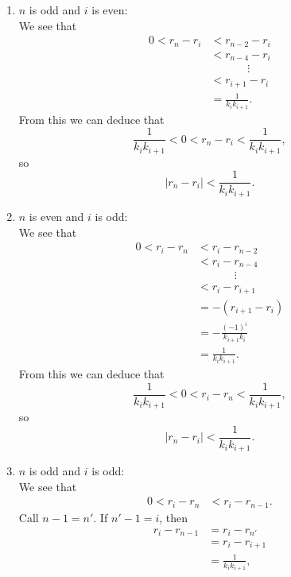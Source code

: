 \documentclass[12 pt]{amsart}
\begin{document}
  \begin{enumerate}[(1)]
    \item $n$ is odd and $i$ is even: \\
      We see that 
      \begin{align*}
        0 < r_n - r_i &< r_{n-2} - r_i \\
                      &< r_{n-4} - r_i \\
                      &\phantom{<\qquad}\vdots \\
                      &< r_{i+1} - r_i \\
                      &= \frac{1}{k_i k_{i+1}}.
      \end{align*}
      From this we can deduce that
      \[
        \frac{1}{k_i k_{i+1}} < 0 < r_n - r_i < \frac{1}{k_i k_{i+1}},
      \]
      so 
      \[
        | r_n - r_i | < \frac{1}{k_i k_{i+1}}.
      \]
    \item $n$ is even and $i$ is odd: \\
      We see that
      \begin{align*}
        0 < r_i - r_n &< r_i - r_{n-2} \\
                      &< r_i - r_{n-4} \\
                      &\phantom{<\qquad}\vdots \\
                      &< r_i - r_{i+1} \\
                      &= -(r_{i+1} - r_i) \\
                      &= - \frac{(-1)^i}{k_{i+1}k_i} \\
                      &= \frac{1}{k_i k_{i+1}}.
      \end{align*}
      From this we can deduce that
      \[
        \frac{1}{k_i k_{i+1}} < 0 < r_i - r_n < \frac{1}{k_i k_{i+1}},
      \]
      so 
      \[
        | r_n - r_i | < \frac{1}{k_i k_{i+1}}.
      \]
    \item $n$ is odd and $i$ is odd: \\
      We see that 
      \begin{align*}
        0 < r_i - r_n &< r_i - r_{n-1}.
      \end{align*}
      Call $n - 1 = n'$.
      If $n' - 1 = i$, then
      \begin{align*}
        r_i - r_{n-1} &= r_i - r_{n'} \\
                      &= r_i - r_{i+1} \\
                      &= \frac{1}{k_i k_{i+1}},
      \end{align*}

\end{enumerate}
\end{document}
